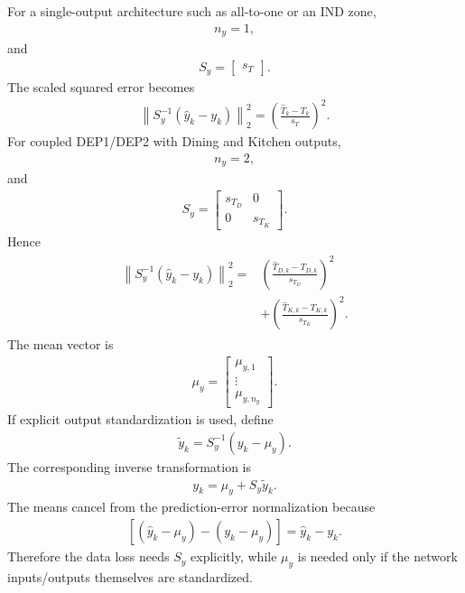 \documentclass[11pt]{article}
\begin{document}
For a single-output architecture such as all-to-one or an IND zone,
\begin{align}
n_y=1,
\end{align}
and
\begin{align}
\boxed{S_y=\begin{bmatrix}s_T\end{bmatrix}.}
\tag{P2.20}
\end{align}
The scaled squared error becomes
\begin{align}
\boxed{\left\|S_y^{-1}(\widehat y_k-y_k)\right\|_2^2=\left(\frac{\widehat T_k-T_k}{s_T}\right)^2.}
\tag{P2.21}
\end{align}
For coupled DEP1/DEP2 with Dining and Kitchen outputs,
\begin{align}
n_y=2,
\end{align}
and
\begin{align}
\boxed{S_y=\begin{bmatrix}s_{T_D}&0\\0&s_{T_K}\end{bmatrix}.}
\tag{P2.22}
\end{align}
Hence
\begin{align}
\boxed{\begin{aligned}
\left\|S_y^{-1}(\widehat y_k-y_k)\right\|_2^2={}&\left(\frac{\widehat T_{D,k}-T_{D,k}}{s_{T_D}}\right)^2\\
&+\left(\frac{\widehat T_{K,k}-T_{K,k}}{s_{T_K}}\right)^2.
\end{aligned}}
\tag{P2.23}
\end{align}
The mean vector is
\begin{align}
\boxed{\mu_y=\begin{bmatrix}\mu_{y,1}\\ \vdots\\ \mu_{y,n_y}\end{bmatrix}.}
\tag{P2.24}
\end{align}
If explicit output standardization is used, define
\begin{align}
\boxed{\widetilde y_k=S_y^{-1}(y_k-\mu_y).}
\tag{P2.25}
\end{align}
The corresponding inverse transformation is
\begin{align}
\boxed{y_k=\mu_y+S_y\widetilde y_k.}
\tag{P2.26}
\end{align}
The means cancel from the prediction-error normalization because
\begin{align}
\left[(\widehat y_k-\mu_y)-(y_k-\mu_y)\right]=\widehat y_k-y_k.
\tag{P2.27}
\end{align}
Therefore the data loss needs \(S_y\) explicitly, while \(\mu_y\) is needed only if the network inputs/outputs themselves are standardized.
\end{document}
